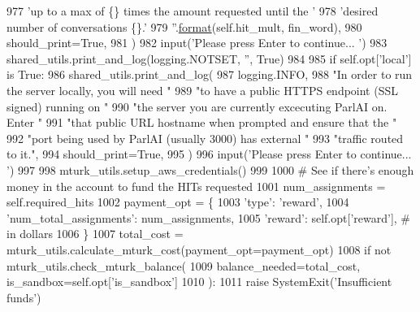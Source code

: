 \begin{DoxyCode}
977                 \textcolor{stringliteral}{'up to a max of \{\} times the amount requested until the '}
978                 \textcolor{stringliteral}{'desired number of conversations \{\}.'}
979                 \textcolor{stringliteral}{''}.\hyperlink{namespaceparlai_1_1chat__service_1_1services_1_1messenger_1_1shared__utils_a32e2e2022b824fbaf80c747160b52a76}{format}(self.hit\_mult, fin\_word),
980                 should\_print=\textcolor{keyword}{True},
981             )
982         input(\textcolor{stringliteral}{'Please press Enter to continue... '})
983         shared\_utils.print\_and\_log(logging.NOTSET, \textcolor{stringliteral}{''}, \textcolor{keyword}{True})
984 
985         \textcolor{keywordflow}{if} self.opt[\textcolor{stringliteral}{'local'}] \textcolor{keywordflow}{is} \textcolor{keyword}{True}:
986             shared\_utils.print\_and\_log(
987                 logging.INFO,
988                 \textcolor{stringliteral}{"In order to run the server locally, you will need "}
989                 \textcolor{stringliteral}{"to have a public HTTPS endpoint (SSL signed) running on "}
990                 \textcolor{stringliteral}{"the server you are currently excecuting ParlAI on. Enter "}
991                 \textcolor{stringliteral}{"that public URL hostname when prompted and ensure that the "}
992                 \textcolor{stringliteral}{"port being used by ParlAI (usually 3000) has external "}
993                 \textcolor{stringliteral}{"traffic routed to it."},
994                 should\_print=\textcolor{keyword}{True},
995             )
996             input(\textcolor{stringliteral}{'Please press Enter to continue... '})
997 
998         mturk\_utils.setup\_aws\_credentials()
999 
1000         \textcolor{comment}{# See if there's enough money in the account to fund the HITs requested}
1001         num\_assignments = self.required\_hits
1002         payment\_opt = \{
1003             \textcolor{stringliteral}{'type'}: \textcolor{stringliteral}{'reward'},
1004             \textcolor{stringliteral}{'num\_total\_assignments'}: num\_assignments,
1005             \textcolor{stringliteral}{'reward'}: self.opt[\textcolor{stringliteral}{'reward'}],  \textcolor{comment}{# in dollars}
1006         \}
1007         total\_cost = mturk\_utils.calculate\_mturk\_cost(payment\_opt=payment\_opt)
1008         \textcolor{keywordflow}{if} \textcolor{keywordflow}{not} mturk\_utils.check\_mturk\_balance(
1009             balance\_needed=total\_cost, is\_sandbox=self.opt[\textcolor{stringliteral}{'is\_sandbox'}]
1010         ):
1011             \textcolor{keywordflow}{raise} SystemExit(\textcolor{stringliteral}{'Insufficient funds'})

\end{DoxyCode}
